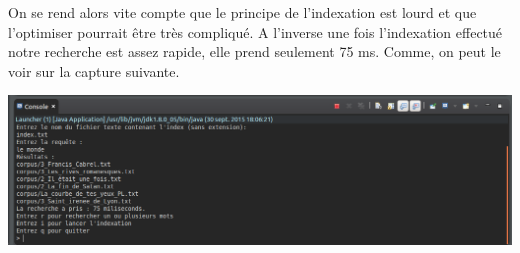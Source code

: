 \documentclass{article}
\begin{document}
On se rend alors vite compte que le principe de l'indexation est lourd et que l'optimiser pourrait être très 
compliqué. A l'inverse une fois l'indexation effectué notre recherche est assez rapide, elle prend seulement 75 ms. Comme, on peut le voir sur la capture suivante.

\begin{center}
	\includegraphics[scale=0.4]{../data/recherche.png}
\end{center}
\end{document}
